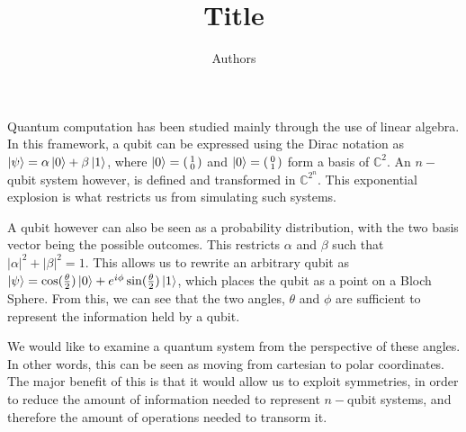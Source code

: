\documentclass[a4paper,10pt]{article}
\title{Title}
\author{Authors}
\date{}
\newcommand{\cVec}[2]{(\begin{smallmatrix}#1\\#2\end{smallmatrix})}
\begin{document}
\maketitle
\thispagestyle{empty}

\onehalfspacing

Quantum computation has been studied mainly through the use of linear algebra. In this framework, a qubit can be expressed
using the Dirac notation as $\Ket{\psi} = \alpha \Ket{0} + \beta \Ket{1}$, where $\Ket{0} = \cVec{1}{0}$ and $\Ket{0} = \cVec{0}{1}$
form a basis of $\mathbb{C}^2$. An $n-$qubit system however, is defined and transformed in $\mathbb{C}^{2^n}$.
This exponential explosion is what restricts us from simulating such systems.

A qubit however can also be seen as a probability distribution, with the two basis vector
being the possible outcomes. This restricts $\alpha$ and $\beta$ such that $|\alpha|^2 + |\beta|^2 = 1$. This
allows us to rewrite an arbitrary qubit as $\Ket{\psi} = \cos(\frac{\theta}{2})\Ket{0} + e^{i\phi}\sin(\frac{\theta}{2})\Ket{1}$,
which places the qubit as a point on a Bloch Sphere. From this, we can see that the two angles, $\theta$ and $\phi$ are sufficient
to represent the information held by a qubit.

We would like to examine a quantum system from the perspective of these angles. In other words, this can be seen as moving from
cartesian to polar coordinates. The major benefit of this is that it would allow us to exploit symmetries, in order to reduce
the amount of information needed to represent $n-$qubit systems, and therefore the amount of operations needed to transorm it.

\end{document}
